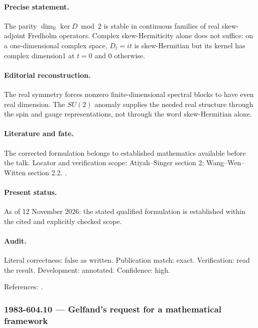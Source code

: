 \paragraph{Precise statement.} The parity \(\dim_{\mathbb R}\ker D\bmod2\) is stable in continuous families of real skew-adjoint Fredholm operators. Complex skew-Hermiticity alone does not suffice: on a one-dimensional complex space, \(D_t=it\) is skew-Hermitian but its kernel has complex dimension1 at \(t=0\) and 0 otherwise.

\paragraph{Editorial reconstruction.} The real symmetry forces nonzero finite-dimensional spectral blocks to have even real dimension. The \(SU(2)\) anomaly supplies the needed real structure through the spin and gauge representations, not through the word skew-Hermitian alone.

\paragraph{Literature and fate.} The corrected formulation belongs to established mathematics available before the talk. Locator and verification scope: Atiyah--Singer section 2; Wang--Wen--Witten section 2.2. \cite{atiyahsinger1971index5,wangwenwitten2019new}.

\paragraph{Present status.} As of 12 November 2026: the stated qualified formulation is established within the cited and explicitly checked scope.

\paragraph{Audit.} Literal correctness: false as written. Publication match: exact. Verification: read the result. Development: annotated. Confidence: high.

\noindent References: \citep{atiyahsinger1971index5,wangwenwitten2019new}.\par

\subsubsection{1983-604.10 --- Gelfand's request for a mathematical framework}

